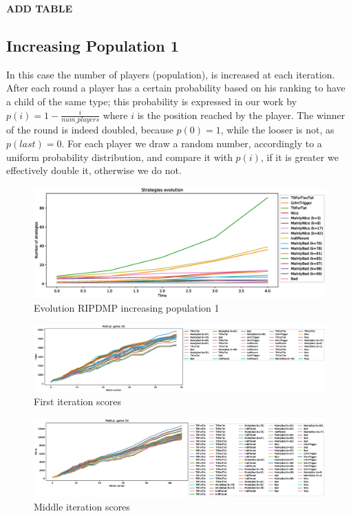 \documentclass[journal,a4paper,10pt,twoside]{IEEEtran} %
\begin{document}
\textbf{ADD TABLE}

\subsection{Increasing Population 1}
In this case the number of players (population), is increased at each iteration. After each round a player has a certain probability based on his ranking to have a child of the same type; this probability is expressed in our work by $p(i)=1-\frac{i}{num\_players}$ where $i$ is the position reached by the player. The winner of the round is indeed doubled, because $p(0)=1$, while the looser is not, as $p(last)=0$.
For each player we draw a random number, accordingly to a uniform probability distribution, and compare it with $p(i)$, if it is greater we effectively double it, otherwise we do not.

\begin{figure}[!ht]
    \centering
    \includegraphics[width=1\columnwidth]{../img/ripdmp-incr/ripdmp-evolution-increasing-pop-50}
    \caption{Evolution RIPDMP increasing population 1}
    \label{fig:incrR}
\end{figure}

\begin{figure}[!ht]
    \centering
    \includegraphics[width=1\columnwidth]{../img/ripdmp-incr/ripdmp-scores-increasing-pop-50-r0}
    \caption{First iteration scores}
    \label{fig:incrFI}
\end{figure}

\begin{figure}[!ht]
    \centering
    \includegraphics[width=1\columnwidth]{../img/ripdmp-incr/ripdmp-scores-increasing-pop-50-r2}
    \caption{Middle iteration scores}
    \label{fig:incrMI}
\end{figure}
\end{document}
